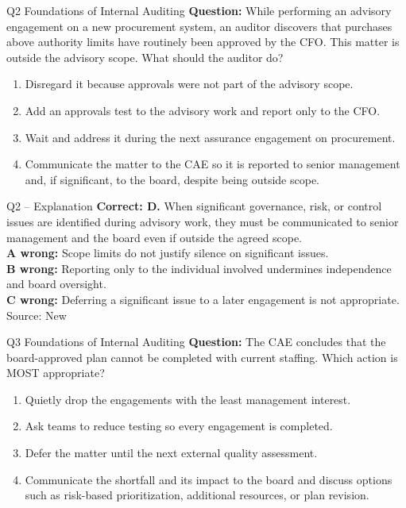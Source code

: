 \documentclass[aspectratio=169,10pt]{beamer}
\begin{document}
\begin{frame}[t]{Q2 \hfill {\scriptsize Foundations of Internal Auditing}}
	\small
	\textbf{Question:} While performing an advisory engagement on a new procurement system, an auditor discovers that purchases above authority limits have routinely been approved by the CFO. This matter is outside the advisory scope. What should the auditor do?
	\begin{enumerate}[label=\Alph*.,itemsep=1pt,topsep=3pt]
			\item Disregard it because approvals were not part of the advisory scope.
			\item Add an approvals test to the advisory work and report only to the CFO.
			\item Wait and address it during the next assurance engagement on procurement.
			\item Communicate the matter to the CAE so it is reported to senior management and, if significant, to the board, despite being outside scope.
	\end{enumerate}
\end{frame}

\begin{frame}[t]{Q2 -- Explanation}
	\footnotesize
	\textbf{Correct: D.} When significant governance, risk, or control issues are identified during advisory work, they must be communicated to senior management and the board even if outside the agreed scope. \\[5pt]
\textbf{A wrong:} Scope limits do not justify silence on significant issues. \\[3pt]
\textbf{B wrong:} Reporting only to the individual involved undermines independence and board oversight. \\[3pt]
\textbf{C wrong:} Deferring a significant issue to a later engagement is not appropriate. \\[3pt]
	\vfill {\tiny Source: New}
\end{frame}

\begin{frame}[t]{Q3 \hfill {\scriptsize Foundations of Internal Auditing}}
	\small
	\textbf{Question:} The CAE concludes that the board-approved plan cannot be completed with current staffing. Which action is MOST appropriate?
	\begin{enumerate}[label=\Alph*.,itemsep=1pt,topsep=3pt]
			\item Quietly drop the engagements with the least management interest.
			\item Ask teams to reduce testing so every engagement is completed.
			\item Defer the matter until the next external quality assessment.
			\item Communicate the shortfall and its impact to the board and discuss options such as risk-based prioritization, additional resources, or plan revision.
	\end{enumerate}
\end{frame}
\end{document}
